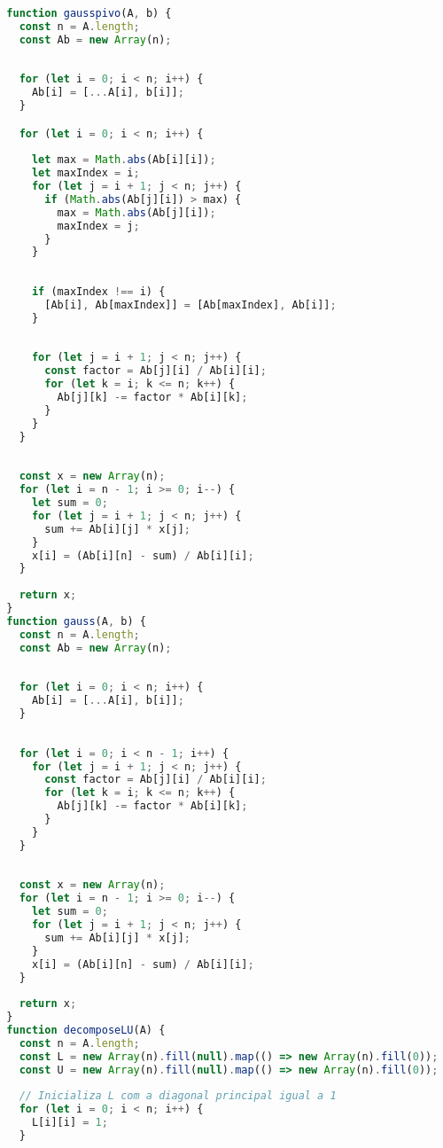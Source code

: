 \documentclass{article}
\begin{document}
\begin{lstlisting}[language=JavaScript, caption=Métodos de eliminação de Gauss e Gauss com pivotamento.]
  
  function gausspivo(A, b) {
    const n = A.length;
    const Ab = new Array(n);
  
   
    for (let i = 0; i < n; i++) {
      Ab[i] = [...A[i], b[i]];
    }

    for (let i = 0; i < n; i++) {
    
      let max = Math.abs(Ab[i][i]);
      let maxIndex = i;
      for (let j = i + 1; j < n; j++) {
        if (Math.abs(Ab[j][i]) > max) {
          max = Math.abs(Ab[j][i]);
          maxIndex = j;
        }
      }
  
      
      if (maxIndex !== i) {
        [Ab[i], Ab[maxIndex]] = [Ab[maxIndex], Ab[i]];
      }
  
      
      for (let j = i + 1; j < n; j++) {
        const factor = Ab[j][i] / Ab[i][i];
        for (let k = i; k <= n; k++) {
          Ab[j][k] -= factor * Ab[i][k];
        }
      }
    }
  
    
    const x = new Array(n);
    for (let i = n - 1; i >= 0; i--) {
      let sum = 0;
      for (let j = i + 1; j < n; j++) {
        sum += Ab[i][j] * x[j];
      }
      x[i] = (Ab[i][n] - sum) / Ab[i][i];
    }
  
    return x;
  }
  function gauss(A, b) {
    const n = A.length;
    const Ab = new Array(n);
  
    
    for (let i = 0; i < n; i++) {
      Ab[i] = [...A[i], b[i]];
    }
  
    
    for (let i = 0; i < n - 1; i++) {
      for (let j = i + 1; j < n; j++) {
        const factor = Ab[j][i] / Ab[i][i];
        for (let k = i; k <= n; k++) {
          Ab[j][k] -= factor * Ab[i][k];
        }
      }
    }
  
    
    const x = new Array(n);
    for (let i = n - 1; i >= 0; i--) {
      let sum = 0;
      for (let j = i + 1; j < n; j++) {
        sum += Ab[i][j] * x[j];
      }
      x[i] = (Ab[i][n] - sum) / Ab[i][i];
    }
  
    return x;
  }
  function decomposeLU(A) {
    const n = A.length;
    const L = new Array(n).fill(null).map(() => new Array(n).fill(0));
    const U = new Array(n).fill(null).map(() => new Array(n).fill(0));
  
    // Inicializa L com a diagonal principal igual a 1
    for (let i = 0; i < n; i++) {
      L[i][i] = 1;
    }
  

\end{lstlisting}
\end{document}
